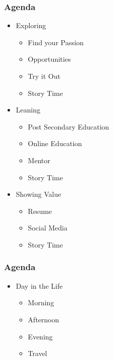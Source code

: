 \documentclass[aspectratio=169]{beamer}
\begin{document}
\begin{frame}
  \frametitle{Agenda}
  \begin{itemize}
    \item{Exploring}
      \begin{itemize}
        \item{Find your Passion}
        \item{Opportunities}
        \item{Try it Out}
        \item{Story Time}
      \end{itemize}
    \item{Leaning}
      \begin{itemize}
      \item{Post Secondary Education}
      \item{Online Education}
      \item{Mentor}
      \item{Story Time}
      \end{itemize}
    \item{Showing Value}
      \begin{itemize}
        \item{Resume}
        \item{Social Media}
        \item{Story Time}
      \end{itemize}
  \end{itemize}
\end{frame}

\begin{frame}
  \frametitle{Agenda}
  \begin{itemize}
  \item{Day in the Life}
    \begin{itemize}
    \item{Morning}
    \item{Afternoon}
    \item{Evening}
    \item{Travel}
    \end{itemize}
  \end{itemize}
\end{frame}
\end{document}
